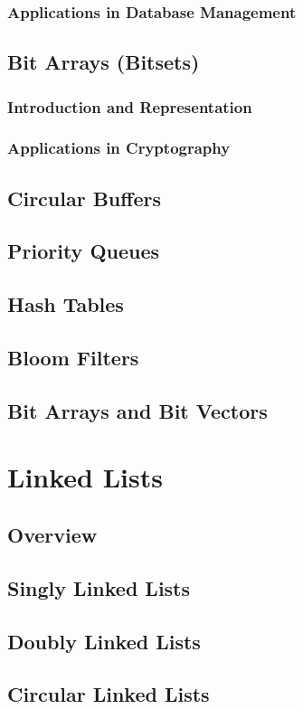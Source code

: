\documentclass[12pt, oneside]{book}
\begin{document}
	\subsection{Applications in Database Management}
	
	\section{Bit Arrays (Bitsets)}
	\subsection{Introduction and Representation}
	\subsection{Applications in Cryptography}
	\section{Circular Buffers}
	\section{Priority Queues}
	\section{Hash Tables}
	\section{Bloom Filters}
	\section{Bit Arrays and Bit Vectors}
	
\chapter{Linked Lists}
\section{Overview}
\section{Singly Linked Lists}
\section{Doubly Linked Lists}
\section{Circular Linked Lists}
\end{document}
